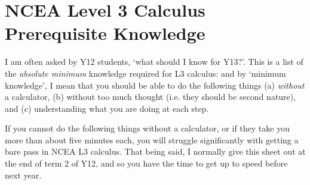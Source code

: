 \documentclass{exam}
\theoremstyle{definition}
\begin{document}
\section*{NCEA Level 3 Calculus\\Prerequisite Knowledge}

I am often asked by Y12 students, `what should I know for Y13?'. This is a list of the \emph{absolute minimum}
knowledge required for L3 calculus: and by `minimum knowledge', I mean that you should be able to do the following
things (a) \emph{without} a calculator, (b) without too much thought (i.e. they should be second nature), and (c)
understanding what you are doing at each step.

If you cannot do the following things without a calculator, or if they take you more than about five minutes each,
you will struggle significantly with getting a bare pass in NCEA L3 calculus. That being said, I normally give this
sheet out at the end of term 2 of Y12, and so you have the time to get up to speed before next year.
\end{document}
